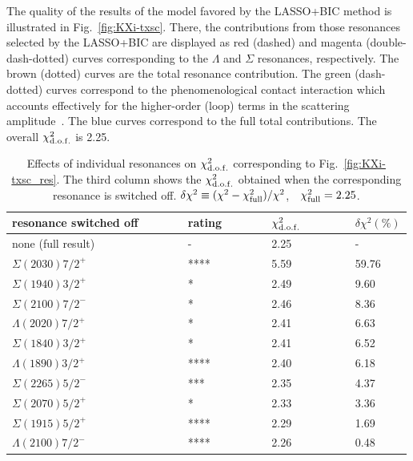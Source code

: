 \documentclass[10pt,aps,prc,superscriptaddress,twoside,twocolumn,nofootinbib,showpacs,preprintnumbers]{revtex4-1}
\begin{document}
The quality of the results of the model favored by the LASSO+BIC method is illustrated in Fig.~\ref{fig:KXi-txsc}. There, the contributions from those resonances selected by the LASSO+BIC are displayed as red (dashed)  and magenta (double-dash-dotted) curves corresponding to the $\Lambda$ and $\Sigma$ resonances, respectively. The brown (dotted) curves are the total resonance contribution. The green (dash-dotted) curves correspond to the phenomenological contact interaction which accounts effectively for the higher-order (loop) terms in the scattering amplitude~\cite{Jackson:2015dva}. The blue curves correspond to the full total contributions. The overall $\chi^2_{\rm d.o.f.}$ is 2.25.


\begin{table}[t]
\centering
\begin{tabular}{llll}
\hline
resonance switched off~~~~~~
&rating~~~~~~
& $\chi^2_{\rm d.o.f.}$ ~~~~~~
&  $\delta\chi^2 (\%)$  \\
\hline 
none (full result)  &   -     & 2.25     &     -     \\
$\Sigma(2030)7/2^+$ &  ****   & 5.59     &   59.76   \\
$\Sigma(1940)3/2^+$ &       * & 2.49     &   9.60    \\
$\Sigma(2100)7/2^-$ &     *   & 2.46     &   8.36    \\
$\Lambda(2020)7/2^+$&    *    & 2.41     &   6.63    \\
$\Sigma(1840)3/2^+$ &       * & 2.41     &   6.52    \\
$\Lambda(1890)3/2^+$&  ****   & 2.40     &   6.18    \\
$\Sigma(2265)5/2^-$ &   ***   & 2.35     &   4.37    \\
$\Sigma(2070)5/2^+$ &      *  & 2.33     &   3.36    \\
$\Sigma(1915)5/2^+$ &   ****  & 2.29     &   1.69    \\
$\Lambda(2100)7/2^-$&  ****   & 2.26     &   0.48    \\
\hline
\end{tabular}
\caption{
Effects of individual resonances on $\chi^2_{\rm d.o.f.}$ corresponding to Fig.~\ref{fig:KXi-txsc_res}. The third column shows the $\chi^2_{\rm d.o.f.}$ obtained when the corresponding resonance is switched off. 
$\delta\chi^2 \equiv (\chi^2 - \chi^2_{\rm full}) / \chi^2$,\  \ $\chi^2_{\rm full}=2.25$.
\label{tbl:KXi-res}}
\end{table}
\end{document}
